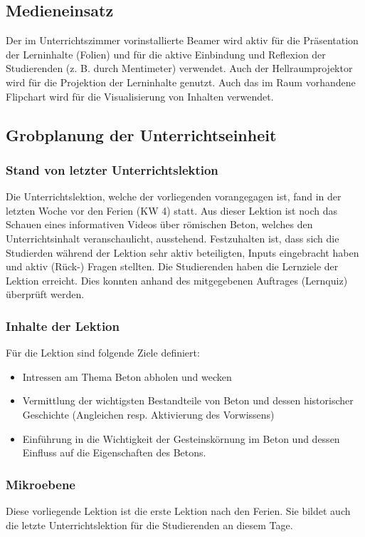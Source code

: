 \documentclass[
11pt,
captions=tableheading,
smallheadings,
headsepline,
footsepline, 
captions=tableheading,
parskip=half-,
]{scrartcl}
\begin{document}
\subsection{Medieneinsatz}
Der im Unterrichtszimmer vorinstallierte Beamer wird aktiv für die Präsentation der Lerninhalte (Folien) und für die aktive Einbindung und Reflexion der Studierenden (z. B. durch Mentimeter) verwendet.
Auch der Hellraumprojektor wird für die Projektion der Lerninhalte genutzt. Auch das im Raum vorhandene Flipchart wird für die Visualisierung von Inhalten verwendet.

\subsection{Grobplanung der Unterrichtseinheit}
\subsubsection{Stand von letzter Unterrichtslektion}
Die Unterrichtslektion, welche der vorliegenden vorangegagen ist, fand in der letzten Woche vor den Ferien (KW 4) statt. Aus dieser Lektion ist noch das Schauen eines informativen Videos über römischen Beton, welches den Unterrichtsinhalt veranschaulicht, ausstehend. 
Festzuhalten ist, dass sich die Studierden während der Lektion sehr aktiv beteiligten, Inputs eingebracht haben und aktiv (Rück-) Fragen stellten.
Die Studierenden haben die Lernziele der Lektion erreicht. Dies konnten anhand des mitgegebenen Auftrages (Lernquiz) überprüft werden.


\subsubsection{Inhalte der Lektion}
Für die Lektion sind folgende Ziele definiert:
\begin{itemize}
    \item Intressen am Thema Beton abholen und wecken
    \item Vermittlung der wichtigsten Bestandteile von Beton und dessen historischer Geschichte (Angleichen resp. Aktivierung des Vorwissens)
    \item Einführung in die Wichtigkeit der Gesteinskörnung im Beton und dessen Einfluss auf die Eigenschaften des Betons.
\end{itemize}


\subsubsection{Mikroebene}
Diese vorliegende Lektion ist die erste Lektion nach den Ferien. Sie bildet auch die letzte Unterrichtslektion für die Studierenden an diesem Tage. 
\end{document}
